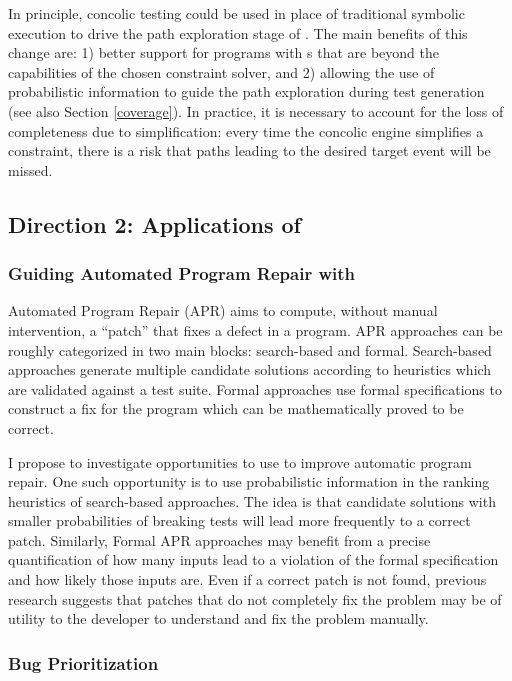 \documentclass[10pt]{article}
\newcounter{list}
\begin{document}
In principle, concolic testing could be used in place of traditional
symbolic execution to drive the path exploration stage of \PSE{}. The
main benefits of this change are: 1) better support for programs with
\PC s that are beyond the capabilities of the chosen constraint solver, and
2) allowing the use of probabilistic information to guide the path
exploration during test generation (see also Section \ref{coverage}).  In
practice, it is necessary to account for the loss of completeness due
to simplification: every time the concolic engine simplifies a
constraint, there is a risk that paths leading to the desired target
event will be missed. 


\subsection{Direction 2: Applications of \PSE{}}

\subsubsection{ Guiding Automated Program Repair with \PSE{} }

Automated Program Repair \cite{le2015manybugs} (APR) aims to compute,
without manual intervention, a ``patch'' that fixes a defect in a
program. APR approaches can be roughly categorized in two main blocks:
search-based and formal.  Search-based approaches generate
multiple candidate solutions according to heuristics which are
validated against a test suite. Formal approaches use formal
specifications to construct a fix for the program which can be
mathematically proved to be correct.

I propose to investigate opportunities to use \PSE{} to improve
automatic program repair. One such opportunity is to use probabilistic
information in the ranking heuristics of search-based approaches. The
idea is that candidate solutions with smaller probabilities of
breaking tests will lead more frequently to a correct
patch. Similarly, Formal APR approaches may benefit from a precise
quantification of how many inputs lead to a violation of the formal
specification and how likely those inputs are. Even if a correct patch
is not found, previous research \cite{le2013current} suggests that
patches that do not completely fix the problem may be of utility to
the developer to understand and fix the problem manually.

\subsubsection{Bug Prioritization}
\end{document}
